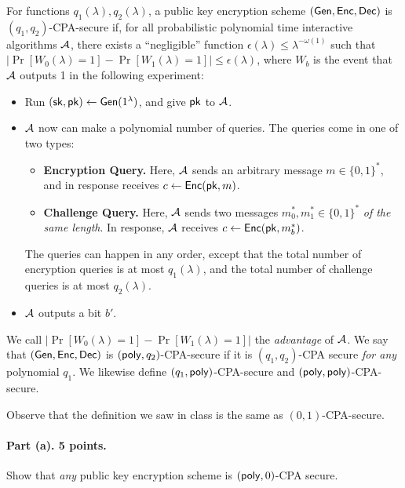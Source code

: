 \documentclass{article}
\begin{document}
\begin{definition} \label{def:cpa} For functions $q_1(\lambda),q_2(\lambda)$, a public key encryption scheme $({\sf Gen},{\sf Enc},{\sf Dec})$ is $(q_1,q_2)$-CPA-secure if, for all probabilistic polynomial time interactive algorithms ${\mathcal{A}}$, there exists a ``negligible'' function $\epsilon(\lambda)\leq\lambda^{-\omega(1)}$ such that $|\Pr[W_0(\lambda)=1]-\Pr[W_1(\lambda)=1]|\leq\epsilon(\lambda)$, where $W_b$ is the event that ${\mathcal{A}}$ outputs 1 in the following experiment:
\begin{itemize}
    \item Run $({\sf sk},{\sf pk})\gets{\sf Gen}(1^\lambda)$, and give ${\sf pk}$ to ${\mathcal{A}}$.
    \item ${\mathcal{A}}$ now can make a polynomial number of queries. The queries come in one of two types:
    \begin{itemize}
        \item {\bf Encryption Query.} Here, ${\mathcal{A}}$ sends an arbitrary message $m\in\{0,1\}^*$, and in response receives $c\gets{\sf Enc}({\sf pk},m)$. 
        \item {\bf Challenge Query.} Here, ${\mathcal{A}}$ sends two messages $m_0^*,m_1^*\in\{0,1\}^*$ \emph{of the same length}. In response, ${\mathcal{A}}$ receives $c\gets{\sf Enc}({\sf pk},m_b^*)$.
    \end{itemize}
    The queries can happen in any order, except that the total number of encryption queries is at most $q_1(\lambda)$, and the total number of challenge queries is at most $q_2(\lambda)$. 
    \item ${\mathcal{A}}$ outputs a bit $b'$.
\end{itemize}
We call $|\Pr[W_0(\lambda)=1]-\Pr[W_1(\lambda)=1]|$ the \emph{advantage} of ${\mathcal{A}}$. We say that $({\sf Gen},{\sf Enc},{\sf Dec})$ is $({\sf poly},q_2)$-CPA-secure if it is $(q_1,q_2)$-CPA secure \emph{for any} polynomial $q_1$. We likewise define $(q_1,{\sf poly})$-CPA-secure and $({\sf poly},{\sf poly})$-CPA-secure.
\end{definition}

Observe that the definition we saw in class is the same as $(0,1)$-CPA-secure.

\paragraph{Part (a). 5 points.} Show that \emph{any} public key encryption scheme is $({\sf poly},0)$-CPA secure.
\end{document}

